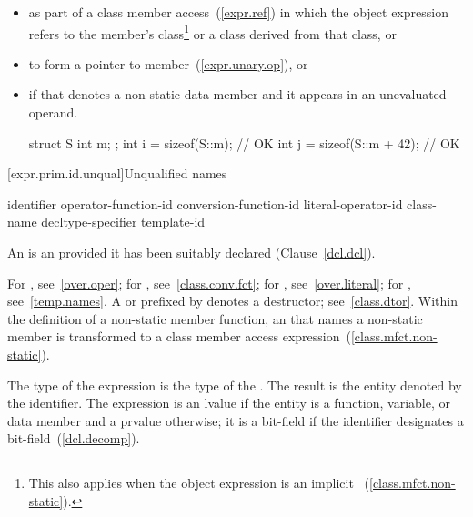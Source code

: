 \begin{itemize}
\item as part of a class member access~(\ref{expr.ref}) in which the
object expression
refers to the member's class\footnote{This also applies when the object expression
is an implicit ~(\ref{class.mfct.non-static}).} or a class derived from
that class, or

\item to form a pointer to member~(\ref{expr.unary.op}), or

\item if that  denotes a non-static data member
and it appears in an unevaluated operand.
\begin{example}

\begin{codeblock}
struct S {
  int m;
};
int i = sizeof(S::m);           // OK
int j = sizeof(S::m + 42);      // OK
\end{codeblock}
\end{example}
\end{itemize}

[expr.prim.id.unqual]{Unqualified names}

\begin{bnf}
\br
    identifier\br
    operator-function-id\br
    conversion-function-id\br
    literal-operator-id\br
    \terminal{\tilde} class-name\br
    \terminal{\tilde} decltype-specifier\br
    template-id
\end{bnf}

\pnum
{}%
An  is an  provided it has
been suitably declared (Clause~\ref{dcl.dcl}).
\begin{note}
For , see~\ref{over.oper}; for
, see~\ref{class.conv.fct}; for
, see~\ref{over.literal}; for
, see~\ref{temp.names}. A 
or 
prefixed by \tcode{\tilde} denotes a destructor; see~\ref{class.dtor}.
Within the definition of a non-static member function, an
 that names a non-static member is transformed to a
class member access expression~(\ref{class.mfct.non-static}).
\end{note}
The type of the expression is the type of the . The
result is the entity denoted by the identifier. The expression is an lvalue
if the entity is a function, variable, or data member and a prvalue otherwise;
it is a bit-field if the identifier designates a bit-field~(\ref{dcl.decomp}).

